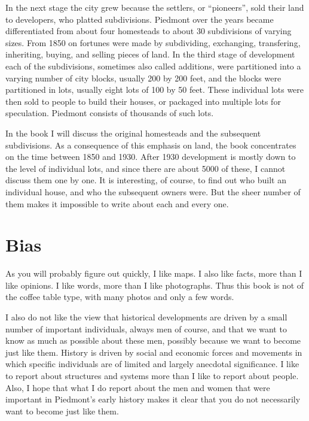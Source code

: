 \documentclass[
  12pt,
]{book}
\begin{document}
In the next stage the city grew because the settlers, or ``pioneers'', sold their land to developers, who platted subdivisions. Piedmont over the years became differentiated from about four homesteads to about 30 subdivisions of varying sizes. From 1850 on fortunes were made by subdividing, exchanging, transfering, inheriting, buying, and selling pieces of land. In the third stage of development each of the subdivisions, sometimes also called additions, were partitioned into a varying number of city blocks, usually 200 by 200 feet, and the blocks were partitioned in lots, usually eight lots of 100 by 50 feet. These individual lots were then sold to people to build their houses, or packaged into multiple lots for speculation. Piedmont consists of thousands of such lots.

In the book I will discuss the original homesteads and the subsequent subdivisions. As a consequence of this emphasis on land, the book concentrates on the time between 1850 and 1930. After 1930 development is mostly down to the level of individual lots, and since there are about 5000 of these, I cannot discuss them one by one. It is interesting, of course, to find out who built an individual house, and who the subsequent owners were. But the sheer number of them makes it impossible to write about each and every one.

\hypertarget{bias}{%
\section*{Bias}\label{bias}}

As you will probably figure out quickly, I like maps. I also like facts, more than I like opinions. I like words, more than I like photographs. Thus this book is not of the coffee table type, with many photos and only a few words.

I also do not like the view that historical developments are driven by a small number of important individuals, always men of course, and that we want to know as much as possible about these men, possibly because we want to become just like them. History is driven by social and economic forces and movements in which specific individuals are of limited and largely anecdotal significance. I like to report about structures and systems more than I like to report about people. Also, I hope that what I do report about the men and women that were important in Piedmont's early history makes it clear that you do not necessarily want to become just like them.
\end{document}
